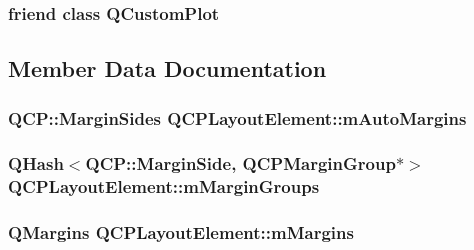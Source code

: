 \subsubsection[{\texorpdfstring{Q\+Custom\+Plot}{QCustomPlot}}]{\setlength{\rightskip}{0pt plus 5cm}friend class {\bf Q\+Custom\+Plot}\hspace{0.3cm}{\ttfamily [friend]}}\hypertarget{classQCPLayoutElement_a1cdf9df76adcfae45261690aa0ca2198}{}\label{classQCPLayoutElement_a1cdf9df76adcfae45261690aa0ca2198}


\subsection{Member Data Documentation}
\subsubsection[{\texorpdfstring{m\+Auto\+Margins}{mAutoMargins}}]{\setlength{\rightskip}{0pt plus 5cm}Q\+C\+P\+::\+Margin\+Sides Q\+C\+P\+Layout\+Element\+::m\+Auto\+Margins\hspace{0.3cm}{\ttfamily [protected]}}\hypertarget{classQCPLayoutElement_af61c70354d1275778d68206b2a1b2d36}{}\label{classQCPLayoutElement_af61c70354d1275778d68206b2a1b2d36}
\subsubsection[{\texorpdfstring{m\+Margin\+Groups}{mMarginGroups}}]{\setlength{\rightskip}{0pt plus 5cm}Q\+Hash$<${\bf Q\+C\+P\+::\+Margin\+Side}, {\bf Q\+C\+P\+Margin\+Group}$\ast$$>$ Q\+C\+P\+Layout\+Element\+::m\+Margin\+Groups\hspace{0.3cm}{\ttfamily [protected]}}\hypertarget{classQCPLayoutElement_aeafbbc1130e02eee663c5326761fc963}{}\label{classQCPLayoutElement_aeafbbc1130e02eee663c5326761fc963}
\subsubsection[{\texorpdfstring{m\+Margins}{mMargins}}]{\setlength{\rightskip}{0pt plus 5cm}Q\+Margins Q\+C\+P\+Layout\+Element\+::m\+Margins\hspace{0.3cm}{\ttfamily [protected]}}\hypertarget{classQCPLayoutElement_ac2a32b99ee527ca5dfff9da03628fe94}{}\label{classQCPLayoutElement_ac2a32b99ee527ca5dfff9da03628fe94}
